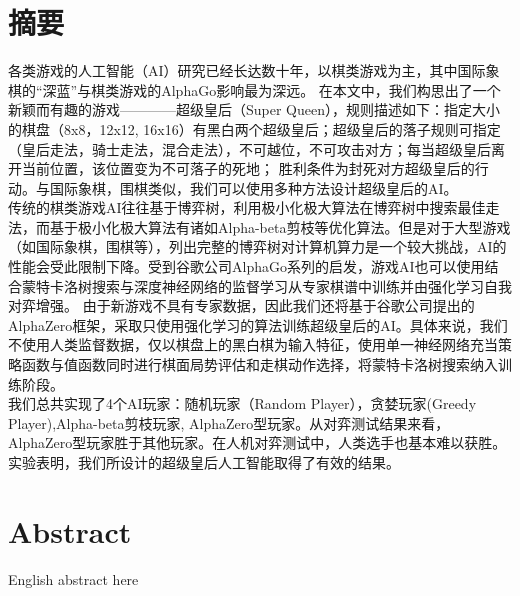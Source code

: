 \chapter*{摘要}

各类游戏的人工智能（AI）研究已经长达数十年，以棋类游戏为主，其中国际象棋的“深蓝”与棋类游戏的AlphaGo影响最为深远。
在本文中，我们构思出了一个新颖而有趣的游戏————超级皇后（Super Queen），规则描述如下：指定大小的棋盘（8x8，12x12, 16x16）有黑白两个超级皇后；超级皇后的落子规则可指定（皇后走法，骑士走法，混合走法），不可越位，不可攻击对方；每当超级皇后离开当前位置，该位置变为不可落子的死地；
胜利条件为封死对方超级皇后的行动。与国际象棋，围棋类似，我们可以使用多种方法设计超级皇后的AI。
\\
传统的棋类游戏AI往往基于博弈树，利用极小化极大算法在博弈树中搜索最佳走法，而基于极小化极大算法有诸如Alpha-beta剪枝等优化算法。但是对于大型游戏（如国际象棋，围棋等），列出完整的博弈树对计算机算力是一个较大挑战，AI的性能会受此限制下降。受到谷歌公司AlphaGo系列的启发，游戏AI也可以使用结合蒙特卡洛树搜索与深度神经网络的监督学习从专家棋谱中训练并由强化学习自我对弈增强。
由于新游戏不具有专家数据，因此我们还将基于谷歌公司提出的AlphaZero框架，采取只使用强化学习的算法训练超级皇后的AI。具体来说，我们不使用人类监督数据，仅以棋盘上的黑白棋为输入特征，使用单一神经网络充当策略函数与值函数同时进行棋面局势评估和走棋动作选择，将蒙特卡洛树搜索纳入训练阶段。
\\
我们总共实现了4个AI玩家：随机玩家（Random Player），贪婪玩家(Greedy Player),Alpha-beta剪枝玩家, AlphaZero型玩家。从对弈测试结果来看，AlphaZero型玩家胜于其他玩家。在人机对弈测试中，人类选手也基本难以获胜。实验表明，我们所设计的超级皇后人工智能取得了有效的结果。


\chapter*{Abstract}

English abstract here
